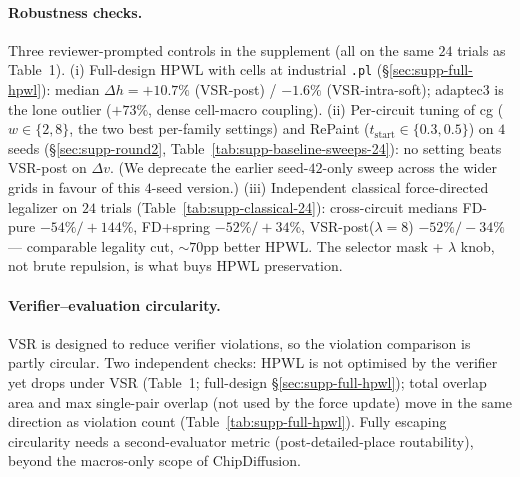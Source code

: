 \documentclass{article}
\begin{document}
\begin{table}[h]
\centering
\small
\setlength{\tabcolsep}{3pt}
\resizebox{\linewidth}{!}{}
\caption{Circuit-level paired Wilcoxon, $n{=}6$.  $^{\star}$: raw $p<0.05$.
``BH-adj.'' is Benjamini--Hochberg FDR adjusted \emph{per metric column}
($m{=}8$ tests within $\Delta v$ and $m{=}8$ within $\Delta h$,
applied independently; $16$ p-values total).  ``Bonferroni'' is the
very conservative family-wise control with the same per-column
$m{=}8$.  Under BH, VSR-post outperforms both CD legalizers
on both metrics; under Bonferroni nothing reaches $p_\text{Bonf}{<}0.05$
on $n{=}6$.  The seed-level $n{=}24$ table is in the supplement
(Table~\ref{tab:wilcoxon-seed}).}
\label{tab:wilcoxon}
\end{table}

\paragraph{Robustness checks.} Three reviewer-prompted controls in the
supplement (all on the same $24$ trials as Table~1).
(i) Full-design HPWL with cells at industrial \texttt{.pl}
(\S\ref{sec:supp-full-hpwl}): median $\Delta h{=}{+}10.7\%$
(VSR-post) / $-1.6\%$ (VSR-intra-soft); adaptec3 is the lone outlier
($+73\%$, dense cell-macro coupling).
(ii) Per-circuit tuning of cg ($w\in\{2,8\}$, the two best per-family
settings) and RePaint ($t_\text{start}\in\{0.3, 0.5\}$) on $4$ seeds
(\S\ref{sec:supp-round2}, Table~\ref{tab:supp-baseline-sweeps-24}):
no setting beats VSR-post on $\Delta v$.  (We deprecate the earlier
seed-$42$-only sweep across the wider grids in favour of this $4$-seed
version.)
(iii) Independent classical force-directed legalizer on $24$ trials
(Table~\ref{tab:supp-classical-24}): cross-circuit medians
FD-pure $-54\%/{+}144\%$, FD+spring $-52\%/{+}34\%$, VSR-post($\lambda{=}8$)
$-52\%/{-}34\%$ --- comparable legality cut, $\sim 70$pp better HPWL.
The selector mask + $\lambda$ knob, not brute repulsion, is what buys
HPWL preservation.

\paragraph{Verifier--evaluation circularity.} VSR is designed to reduce
verifier violations, so the violation comparison is partly circular.
Two independent checks: HPWL is not optimised by the verifier yet
drops under VSR (Table~1; full-design \S\ref{sec:supp-full-hpwl});
total overlap area and max single-pair overlap (not used by the force
update) move in the same direction as violation count
(Table~\ref{tab:supp-full-hpwl}).  Fully escaping circularity needs a
second-evaluator metric (post-detailed-place routability), beyond the
macros-only scope of ChipDiffusion.
\end{document}
